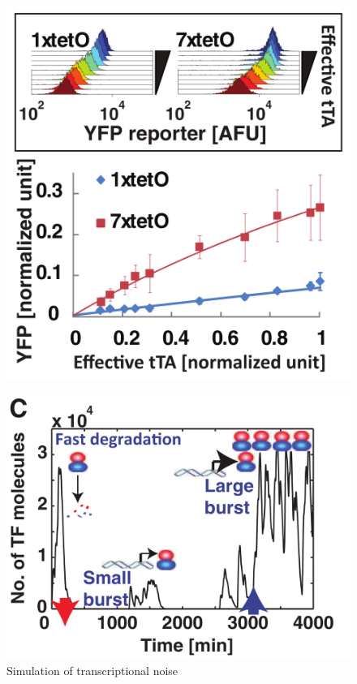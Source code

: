 \documentclass{beamer}
\begin{document}
\begin{frame}
    \begin{figure}[ht!]
        \centering
        \includegraphics[width=.8\textwidth]{Tofig3.png}
        \label{fig:fig3to}
    \end{figure}
\end{frame}
  
 \begin{frame}
    \begin{figure}[ht!]
        \centering
        \includegraphics[width=.8\textwidth]{Tofig4.png}
        \caption{Simulation of transcriptional noise}
        \label{fig:fig4to}
    \end{figure}
\end{frame}
\end{document}
